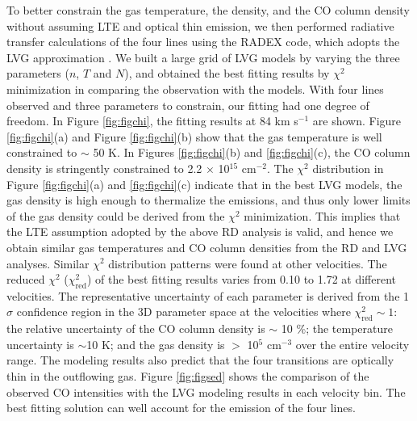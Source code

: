 To better constrain the gas temperature, the density, and the CO column density without assuming LTE and optical thin emission, we then performed radiative transfer calculations of the four lines using the RADEX code, which adopts the LVG approximation \citep{2007A&A...468..627V}. We built a large grid of LVG models by varying the three parameters ($n$, $T$ and $N$), and obtained the best fitting results by $\chi^2$ minimization in comparing the observation with the models. With four lines observed and three parameters to constrain, our fitting had one degree of freedom. In Figure \ref{fig:figchi}, the fitting results at 84 km s$^{-1}$ are shown. Figure \ref{fig:figchi}(a) and Figure \ref{fig:figchi}(b) show that the gas temperature is well constrained to $\sim$ 50 K. In Figures \ref{fig:figchi}(b) and \ref{fig:figchi}(c), the CO column density is stringently constrained to 2.2 $\times$ 10$^{15}$ cm$^{-2}$. The $\chi^2$ distribution in Figure \ref{fig:figchi}(a) and \ref{fig:figchi}(c) indicate that in the best LVG models, the gas density is high enough to thermalize the emissions, and thus only lower limits of the gas density could be derived from the $\chi^2$ minimization. This implies that the LTE assumption adopted by the above RD analysis is valid, and hence we obtain similar gas temperatures and CO column densities from the RD and LVG analyses. Similar $\chi^2$ distribution patterns were found at other velocities. The reduced $\chi^2$ ($\chi^2_{\mathrm{red}}$) of the best fitting results varies from 0.10 to 1.72 at different velocities. The representative uncertainty of each parameter is derived from the 1$\sigma$ confidence region in the 3D parameter space at the velocities where $\chi^2_{\mathrm{red}} \sim 1$: the relative uncertainty of the CO column density is $\sim$ 10 \%; the temperature uncertainty is $\sim$10 K; and the gas density is $>$ 10$^5$ cm$^{-3}$ over the entire velocity range. The modeling results also predict that the four transitions are optically thin in the outflowing gas. Figure \ref{fig:figsed} shows the comparison of the observed CO intensities with the LVG modeling results in each velocity bin. The best fitting solution can well account for the emission of the four lines.



